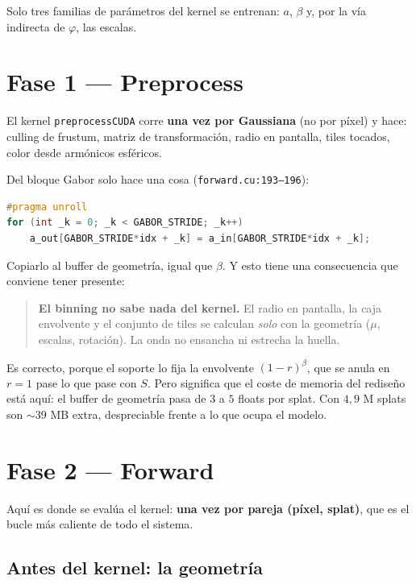 \documentclass[12pt]{extarticle}
\newcommand{\code}[1]{\texttt{#1}}
\begin{document}
Solo tres familias de parámetros del kernel se entrenan: $a$, $\beta$ y, por
la vía indirecta de $\varphi$, las escalas.

\section{Fase 1 --- Preprocess}

El kernel \code{preprocessCUDA} corre \textbf{una vez por Gaussiana} (no por
píxel) y hace: culling de frustum, matriz de transformación, radio en pantalla,
tiles tocados, color desde armónicos esféricos.

Del bloque Gabor solo hace una cosa (\code{forward.cu:193--196}):

\begin{lstlisting}[language=C]
#pragma unroll
for (int _k = 0; _k < GABOR_STRIDE; _k++)
    a_out[GABOR_STRIDE*idx + _k] = a_in[GABOR_STRIDE*idx + _k];
\end{lstlisting}

Copiarlo al buffer de geometría, igual que $\beta$. Y esto tiene una
consecuencia que conviene tener presente:

\begin{quote}
\textbf{El binning no sabe nada del kernel.} El radio en pantalla, la caja
envolvente y el conjunto de tiles se calculan \emph{solo} con la geometría
($\mu$, escalas, rotación). La onda no ensancha ni estrecha la huella.
\end{quote}

Es correcto, porque el soporte lo fija la envolvente $(1-r)^\beta$, que se
anula en $r=1$ pase lo que pase con $S$. Pero significa que el coste de
memoria del rediseño está aquí: el buffer de geometría pasa de $3$ a $5$ floats
por splat. Con $4{,}9$ M splats son $\sim 39$ MB extra, despreciable frente a
lo que ocupa el modelo.

\section{Fase 2 --- Forward}

Aquí es donde se evalúa el kernel: \textbf{una vez por pareja (píxel, splat)},
que es el bucle más caliente de todo el sistema.

\subsection{Antes del kernel: la geometría}
\end{document}
